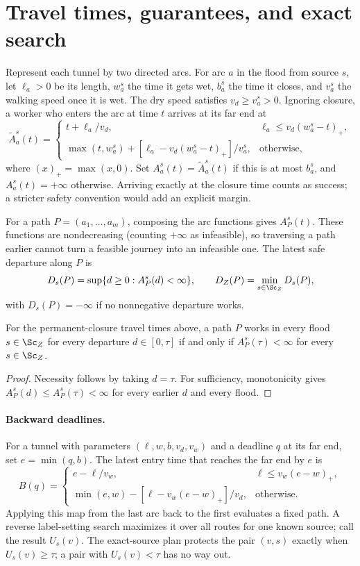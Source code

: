 \section{Travel times, guarantees, and exact search}\label{app:math}
Represent each tunnel by two directed arcs. For arc $a$ in the flood from source $s$, let $\ell_a>0$ be its length, $w_a^s$ the time it gets wet, $b_a^s$ the time it closes, and $v_a^s$ the walking speed once it is wet. The dry speed satisfies $v_d\ge v_a^s>0$. Ignoring closure, a worker who enters the arc at time $t$ arrives at its far end at
\[
 \widetilde A_a^s(t)=
 \begin{cases}
 t+\ell_a/v_d,&\ell_a\le v_d(w_a^s-t)_+,\\
 \max(t,w_a^s)+[\ell_a-v_d(w_a^s-t)_+]/v_a^s,&\text{otherwise},
 \end{cases}
\]
where $(x)_+=\max(x,0)$. Set $A_a^s(t)=\widetilde A_a^s(t)$ if this is at most $b_a^s$, and $A_a^s(t)=+\infty$ otherwise. Arriving exactly at the closure time counts as success; a stricter safety convention would add an explicit margin.

For a path $P=(a_1,\ldots,a_m)$, composing the arc functions gives $A_P^s(t)$. These functions are nondecreasing (counting $+\infty$ as infeasible), so traversing a path earlier cannot turn a feasible journey into an infeasible one. The latest safe departure along $P$ is
\[
 D_s(P)=\sup\{d\ge0:A_P^s(d)<\infty\},\qquad
 D_Z(P)=\min_{s\in\Sc_Z}D_s(P),
\]
with $D_s(P)=-\infty$ if no nonnegative departure works.

\begin{proposition}
For the permanent-closure travel times above, a path $P$ works in every flood $s\in\Sc_Z$ for every departure $d\in[0,\tau]$ if and only if $A_P^s(\tau)<\infty$ for every $s\in\Sc_Z$.
\end{proposition}
\begin{proof}
Necessity follows by taking $d=\tau$. For sufficiency, monotonicity gives $A_P^s(d)\le A_P^s(\tau)<\infty$ for every earlier $d$ and every flood.
\end{proof}

\paragraph{Backward deadlines.}
For a tunnel with parameters $(\ell,w,b,v_d,v_w)$ and a deadline $q$ at its far end, set $e=\min(q,b)$. The latest entry time that reaches the far end by $e$ is
\[
 B(q)=\begin{cases}
 e-\ell/v_w,&\ell\le v_w(e-w)_+,\\
 \min(e,w)-[\ell-v_w(e-w)_+]/v_d,&\text{otherwise}.
 \end{cases}
\]
Applying this map from the last arc back to the first evaluates a fixed path. A reverse label-setting search maximizes it over all routes for one known source; call the result $U_s(v)$. The exact-source plan protects the pair $(v,s)$ exactly when $U_s(v)\ge\tau$; a pair with $U_s(v)<\tau$ has no way out.

